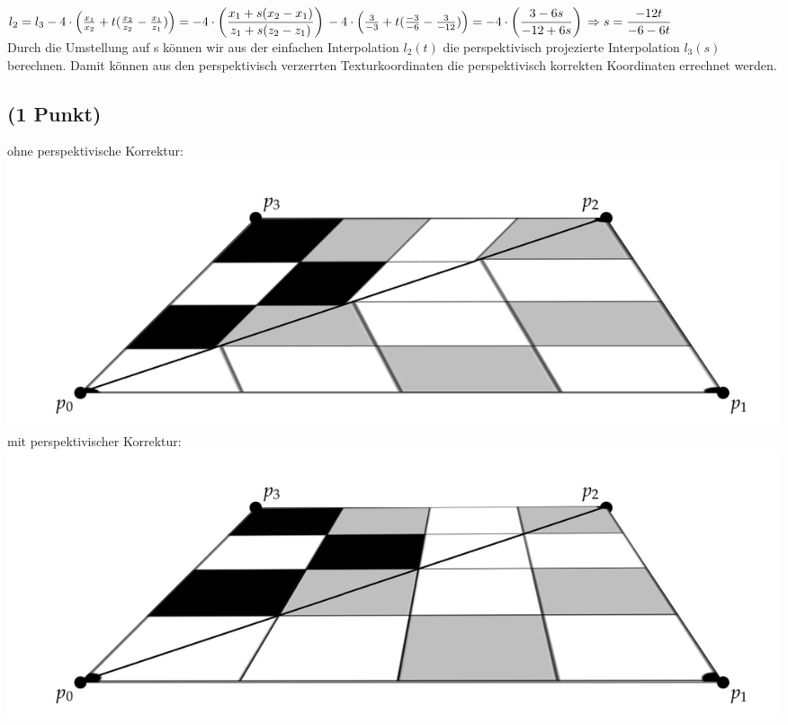 \documentclass[a4paper,10pt,DIV=14]{article}
\begin{document}
$
l_2 = l_3\\
-4 \cdot \left( \frac{x_1}{x_2} + t(\frac{x_2}{z_2} - \frac{x_1}{z_1}) \right) = -4 \cdot \left( \dfrac{x_1 + s (x_2 - x_1)}{z_1 + s (z_2 - z_1)}\right)\\
-4 \cdot \left( \frac{3}{-3} + t(\frac{-3}{-6} - \frac{3}{-12}) \right) = -4 \cdot \left( \dfrac{3 - 6s }{-12 + 6s}\right)\\
\Rightarrow s = \dfrac{-12t}{-6 -6t}
$\\

Durch die Umstellung auf s können wir aus der einfachen Interpolation $l_2(t)$ die perspektivisch projezierte Interpolation $l_3(s)$ berechnen. Damit können aus den perspektivisch verzerrten Texturkoordinaten die perspektivisch korrekten Koordinaten errechnet werden. 

\subsection{(1 Punkt)}

ohne perspektivische Korrektur:\\
\includegraphics[scale = .2]{3d_2}\\

mit perspektivischer Korrektur: \\
\includegraphics[scale= .2]{3d_1}
\end{document}
